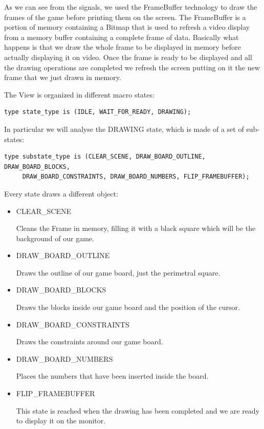 \documentclass[12pt]{report}
\begin{document}
As we can see from the signals, we used the FrameBuffer technology to draw
the frames of the game before printing them on the screen. The FrameBuffer
is a portion of memory containing a Bitmap that is used to refresh a video
display from a memory buffer containing a complete frame of data.
Basically what happens is that we draw the whole frame to be displayed in
memory before actually displaying it on video. Once the frame is ready to
be displayed and all the drawing operations are completed we refresh the
screen putting on it the new frame that we just drawn in memory.

\newpage

The View is organized in different macro states:

\begin{verbatim}
type state_type is (IDLE, WAIT_FOR_READY, DRAWING);
\end{verbatim}

In particular we will analyse the DRAWING state, which is made of a set of
sub-states:

\begin{verbatim}
type substate_type is (CLEAR_SCENE, DRAW_BOARD_OUTLINE, DRAW_BOARD_BLOCKS,
     DRAW_BOARD_CONSTRAINTS, DRAW_BOARD_NUMBERS, FLIP_FRAMEBUFFER);
\end{verbatim}

Every state draws a different object:

\begin{itemize}
  \item CLEAR\_SCENE

  Cleans the Frame in memory, filling it with a black square which will be
  the background of our game.

  \item DRAW\_BOARD\_OUTLINE

  Draws the outline of our game board, just the perimetral square.

  \item DRAW\_BOARD\_BLOCKS

  Draws the blocks inside our game board and the position of the cursor.

  \item DRAW\_BOARD\_CONSTRAINTS

  Draws the constraints around our game board.

  \item DRAW\_BOARD\_NUMBERS

  Places the numbers that have been inserted inside the board.

  \item FLIP\_FRAMEBUFFER

  This state is reached when the drawing has been completed and we are
  ready to display it on the monitor.
\end{itemize}
\end{document}
